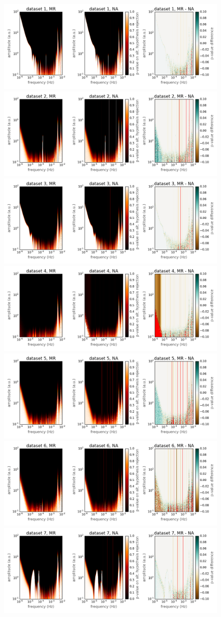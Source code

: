 \begin{figure}[tb]
  \centering \includegraphics[width=0.45\linewidth]{gfx/axions/comparison/comparison_exclusion_dataset1.png}
  \centering \includegraphics[width=0.45\linewidth]{gfx/axions/comparison/comparison_exclusion_dataset2.png}
  \centering \includegraphics[width=0.45\linewidth]{gfx/axions/comparison/comparison_exclusion_dataset3.png}
  \centering \includegraphics[width=0.45\linewidth]{gfx/axions/comparison/comparison_exclusion_dataset4.png}
  \centering \includegraphics[width=0.45\linewidth]{gfx/axions/comparison/comparison_exclusion_dataset5.png}
  \centering \includegraphics[width=0.45\linewidth]{gfx/axions/comparison/comparison_exclusion_dataset6.png}
  \centering \includegraphics[width=0.45\linewidth]{gfx/axions/comparison/comparison_exclusion_dataset7.png}

\end{figure}
